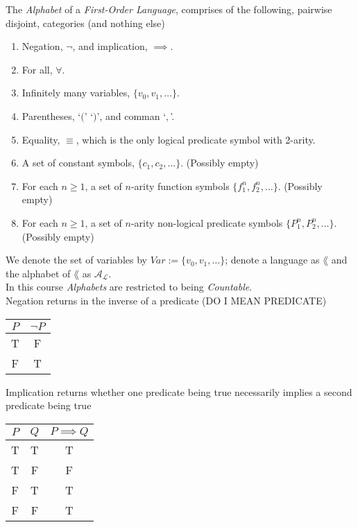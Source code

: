 \documentclass[11pt,a4paper]{article}
\begin{document}
The \textit{Alphabet} of a \textit{First-Order Language}, comprises of the following, pairwise disjoint, categories (and nothing else)
\begin{enumerate}
	\item Negation, $\neg$, and implication, $\implies$.
	\item For all, $\forall$.
	\item Infinitely many variables, $\{v_0,v_1,\dots\}$.
	\item Parentheses, `$($' `$)$', and comman `$,$'.
	\item Equality, $\equiv$, which is the only logical predicate symbol with 2-arity.
	\item A set of constant symbols, $\{c_1,c_2,\dots\}$. (Possibly empty)
	\item For each $n\geq1$, a set of $n$-arity function symbols $\{f_1^n,f_2^n,\dots\}$. (Possibly empty)
	\item For each $n\geq1$, a set of $n$-arity non-logical predicate symbols $\{P_1^n,P_2^n,\dots\}$. (Possibly empty)
\end{enumerate}
\nb We denote the set of variables by $Var:=\{v_0,v_1,\dots\}$; denote a language as $\lang$ and the alphabet of $\lang$ as $\mathcal{A_L}$.\\
\nb In this course \textit{Alphabets} are restricted to being \textit{Countable}.\\

Negation returns in the inverse of a predicate (DO I MEAN PREDICATE)
\begin{center}
\begin{tabular}{c|c}
$P$&$\neg P$\\\hline
T&F\\
F&T
\end{tabular}
\end{center}

Implication returns whether one predicate being true necessarily implies a second predicate being true
\begin{center}
\begin{tabular}{cc|c}
$P$&$Q$&$P\implies Q$\\\hline
T&T&T\\
T&F&F\\
F&T&T\\
F&F&T
\end{tabular}
\end{center}
\end{document}
